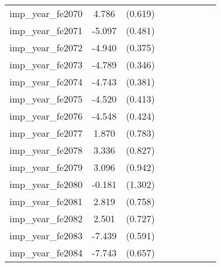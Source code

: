 {\begin{tabular}{l*{4}{cc}}
imp\_year\_fe2070&    4.786\sym{***}&  (0.619)&                  &         &                  &         &                  &         \\
imp\_year\_fe2071&   -5.097\sym{***}&  (0.481)&                  &         &                  &         &                  &         \\
imp\_year\_fe2072&   -4.940\sym{***}&  (0.375)&                  &         &                  &         &                  &         \\
imp\_year\_fe2073&   -4.789\sym{***}&  (0.346)&                  &         &                  &         &                  &         \\
imp\_year\_fe2074&   -4.743\sym{***}&  (0.381)&                  &         &                  &         &                  &         \\
imp\_year\_fe2075&   -4.520\sym{***}&  (0.413)&                  &         &                  &         &                  &         \\
imp\_year\_fe2076&   -4.548\sym{***}&  (0.424)&                  &         &                  &         &                  &         \\
imp\_year\_fe2077&    1.870\sym{*}  &  (0.783)&                  &         &                  &         &                  &         \\
imp\_year\_fe2078&    3.336\sym{***}&  (0.827)&                  &         &                  &         &                  &         \\
imp\_year\_fe2079&    3.096\sym{**} &  (0.942)&                  &         &                  &         &                  &         \\
imp\_year\_fe2080&   -0.181         &  (1.302)&                  &         &                  &         &                  &         \\
imp\_year\_fe2081&    2.819\sym{***}&  (0.758)&                  &         &                  &         &                  &         \\
imp\_year\_fe2082&    2.501\sym{***}&  (0.727)&                  &         &                  &         &                  &         \\
imp\_year\_fe2083&   -7.439\sym{***}&  (0.591)&                  &         &                  &         &                  &         \\
imp\_year\_fe2084&   -7.743\sym{***}&  (0.657)&                  &         &                  &         &                  &         \\

\end{tabular}}
